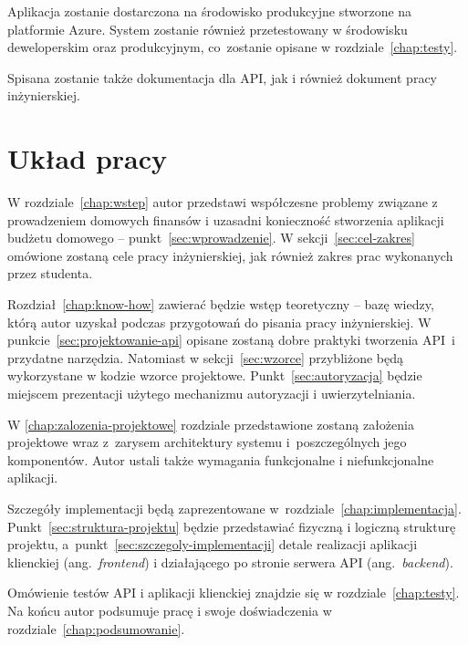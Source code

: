 Aplikacja zostanie dostarczona na środowisko produkcyjne stworzone na platformie Azure. System zostanie również przetestowany w środowisku deweloperskim oraz produkcyjnym, co~zostanie opisane w rozdziale~\ref{chap:testy}.

Spisana zostanie także dokumentacja dla API, jak i również dokument pracy inżynierskiej.

\section{Układ pracy}
\label{sec:uklad-pracy}
W rozdziale~\ref{chap:wstep} autor przedstawi współczesne problemy związane z prowadzeniem domowych finansów i uzasadni konieczność stworzenia aplikacji budżetu domowego -- punkt~\ref{sec:wprowadzenie}. W sekcji~\ref{sec:cel-zakres} omówione zostaną cele pracy inżynierskiej, jak również zakres prac wykonanych  przez studenta.

Rozdział~\ref{chap:know-how} zawierać będzie wstęp teoretyczny -- bazę wiedzy, którą autor uzyskał podczas przygotowań do pisania pracy inżynierskiej. W punkcie~\ref{sec:projektowanie-api} opisane zostaną dobre praktyki tworzenia API~i przydatne narzędzia. Natomiast w sekcji~\ref{sec:wzorce} przybliżone będą wykorzystane w kodzie wzorce projektowe. Punkt~\ref{sec:autoryzacja} będzie miejscem prezentacji użytego mechanizmu autoryzacji i uwierzytelniania.

W \ref{chap:zalozenia-projektowe} rozdziale przedstawione zostaną założenia projektowe wraz z~zarysem architektury systemu i~poszczególnych jego komponentów. Autor ustali także wymagania funkcjonalne i niefunkcjonalne aplikacji.

Szczegóły implementacji będą zaprezentowane w~rozdziale~\ref{chap:implementacja}. Punkt~\ref{sec:struktura-projektu} będzie przedstawiać fizyczną i logiczną strukturę projektu, a~punkt~\ref{sec:szczegoly-implementacji} detale realizacji aplikacji klienckiej (ang.~\emph{frontend}) i działającego po stronie serwera API (ang.~\emph{backend}).

Omówienie testów API i aplikacji klienckiej znajdzie się w rozdziale~\ref{chap:testy}. Na końcu autor podsumuje pracę i swoje doświadczenia w rozdziale~\ref{chap:podsumowanie}.